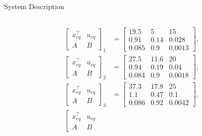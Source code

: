 \begin{slide}{System Description}
  \begin{columns}[c]
    \begin{column}{0.55\textwidth}
      \begin{equation}
        \begin{aligned}
          \label{eq:op-points}
          \left[\begin{array}{c|c}
              x_{eq}^{\top} & u_{eq} \\
              \hline
              A             & B
            \end{array}\right]_{1} & = \left[\begin{array}{cc|c}
              19.5  & 5    & 15     \\
              \hline
              0.91  & 0.14 & 0.028  \\
              0.085 & 0.9  & 0.0013
            \end{array}\right], \\
          \left[\begin{array}{c|c}
              x_{eq}^{\top} & u_{eq} \\
              \hline
              A             & B
            \end{array}\right]_{2} & = \left[\begin{array}{cc|c}
              27.5  & 11.6 & 20     \\
              \hline
              0.94  & 0.19 & 0.04   \\
              0.084 & 0.9  & 0.0018
            \end{array}\right], \\
          \left[\begin{array}{c|c}
              x_{eq}^{\top} & u_{eq} \\
              \hline
              A             & B
            \end{array}\right]_{3} & = \left[\begin{array}{cc|c}
              37.3  & 17.8 & 25     \\
              \hline
              1.1   & 0.47 & 0.1    \\
              0.086 & 0.92 & 0.0042
            \end{array}\right], \\
          \left[\begin{array}{c|c}
              x_{eq}^{\top} & u_{eq} \\
              \hline
              A             & B

\end{array}
\end{aligned}
\end{equation}
\end{column}
\end{columns}
\end{slide}
